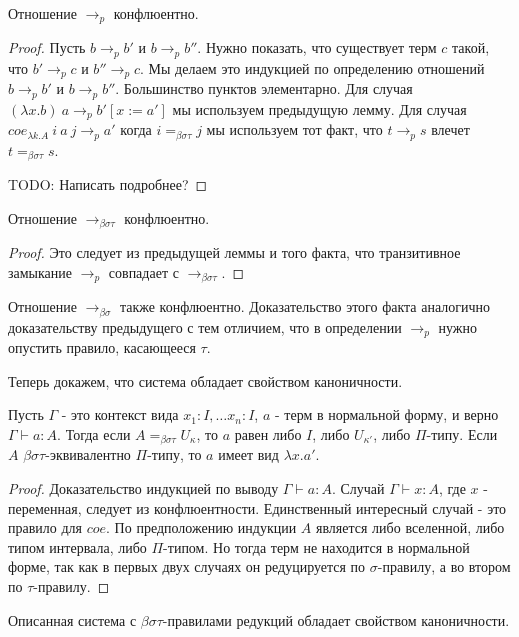 \documentclass{amsart}
\theoremstyle{definition}
\theoremstyle{remark}
\newcommand{\bs}{\beta\sigma}
\newcommand{\rbs}{\to_{\bs}}
\newcommand{\bst}{\bs\tau}
\newcommand{\ebst}{=_{\bst}}
\newcommand{\rbst}{\to_{\bst}}
\numberwithin{figure}{section}
\begin{document}
\begin{lem}
Отношение $\to_p$ конфлюентно.
\end{lem}
\begin{proof}
Пусть $b \to_p b'$ и $b \to_p b''$.
Нужно показать, что существует терм $c$ такой, что $b' \to_p c$ и $b'' \to_p c$.
Мы делаем это индукцией по определению отношений $b \to_p b'$ и $b \to_p b''$.
Большинство пунктов элементарно.
Для случая $(\lambda x. b)\ a \to_p b'[x := a']$ мы используем предыдущую лемму.
Для случая $coe_{\lambda k. A}\ i\ a\ j \to_p a'$ когда $i \ebst j$ мы используем тот факт, что $t \to_p s$ влечет $t \ebst s$.

TODO: Написать подробнее?
\end{proof}

\begin{prop}
Отношение $\rbst$ конфлюентно.
\end{prop}
\begin{proof}
Это следует из предыдущей леммы и того факта, что транзитивное замыкание $\to_p$ совпадает с $\rbst$.
\end{proof}

\begin{remark}
Отношение $\rbs$ также конфлюентно.
Доказательство этого факта аналогично доказательству предыдущего с тем отличием, что в определении $\to_p$ нужно опустить правило, касающееся $\tau$.
\end{remark}

Теперь докажем, что система обладает свойством каноничности.

\begin{prop}
Пусть $\Gamma$ - это контекст вида $x_1 : I, \ldots x_n : I$, $a$ - терм в нормальной форму, и верно $\Gamma \vdash a : A$.
Тогда если $A \ebst U_\kappa$, то $a$ равен либо $I$, либо $U_{\kappa'}$, либо $\Pi$-типу.
Если $A$ $\bst$-эквивалентно $\Pi$-типу, то $a$ имеет вид $\lambda x. a'$.
\end{prop}
\begin{proof}
Доказательство индукцией по выводу $\Gamma \vdash a : A$.
Случай $\Gamma \vdash x : A$, где $x$ - переменная, следует из конфлюентности.
Единственный интересный случай - это правило для $coe$.
По предположению индукции $A$ является либо вселенной, либо типом интервала, либо $\Pi$-типом.
Но тогда терм не находится в нормальной форме, так как в первых двух случаях он редуцируется по $\sigma$-правилу, а во втором по $\tau$-правилу.
\end{proof}

\begin{cor}
Описанная система с $\bst$-правилами редукций обладает свойством каноничности.
\end{cor}
\end{document}
